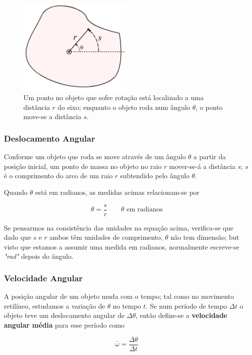 \begin{figure}[h!]
    \centering
    \includegraphics[width=0.5\textwidth]{7/fig/rot1.png}
    \caption{Um ponto no objeto que sofre rotação está localizado a uma distância $r$ do eixo; enquanto o objeto roda num ângulo $\theta$, o ponto move-se a distância $s$.}
\end{figure}

\subsubsection{Deslocamento Angular}
Conforme um objeto que roda se move através de um ângulo $\theta$ a partir da posição inicial, um ponto de massa no objeto no raio $r$ mover-se-á a distância $s$; $s$ é o comprimento do arco de um raio $r$ subtendido pelo ângulo $\theta$.

Quando $\theta$ está em radianos, as medidas acimas relacionam-se por

\begin{equation}
    \theta=\frac{s}{r} \qquad \theta \text{ em radianos}
\end{equation}

Se pensarmos na consistência das unidades na equação acima, verifica-se que dado que $s$ e $r$ ambos têm unidades de comprimento, $\theta$ não tem dimensão; but visto que estamos a assumir uma medida em radianos, normalmente escreve-se \emph{"rad"} depois do ângulo.

\subsubsection{Velocidade Angular}
A posição angular de um objeto muda com o tempo; tal como no movimento retilíneo, estudamos a variação de $\theta$ no tempo $t$. Se num período de tempo $\Delta t$ o objeto teve um deslocamento angular de $\Delta \theta$, então define-se a \textbf{velocidade angular média} para esse período como

\begin{equation}
    \bar{\omega}=\frac{\Delta \theta}{\Delta t}
\end{equation}

